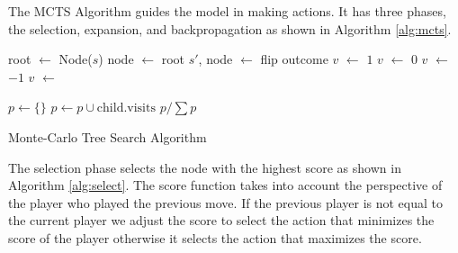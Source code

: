 The MCTS Algorithm guides the model in making actions. It has three phases, the selection, expansion, and backpropagation as shown in Algorithm \ref{alg:mcts}.

\begin{algorithm}[H]
    \begin{algorithmic}[1]
            \State root $\gets$ Node($s$)
            \Repeat
                \State node $\gets$ root
                \State $s'$, node $\gets$ 
                      \State flip outcome
                    \EndIf
                      \State $v$ $\gets$ $1$
                      \State $v$ $\gets$ $0$
                      \State $v$ $\gets$ $-1$
                    \EndIf
                \Else
                    \State $v$ $\gets$ 
                \EndIf
        
                \State {}

            \State $p \gets \{\}$
            \State $p \gets p \cup \text{child.visits}$
            \EndFor
            \State \Return $p / \sum p$
        \EndFunction
    \end{algorithmic}
    \caption{Monte-Carlo Tree Search Algorithm}
    \label{alg:mcts}
\end{algorithm}

The selection phase selects the node with the highest score as shown in Algorithm \ref{alg:select}. The score function takes into account the perspective of the player who played the previous move. If the previous player is not equal to the current player we adjust the score to select the action that minimizes the score of the player otherwise it selects the action that maximizes the score. 

